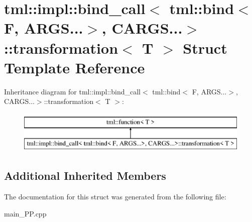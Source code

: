 \hypertarget{structtml_1_1impl_1_1bind__call_3_01tml_1_1bind_3_01F_00_01ARGS_8_8_8_4_00_01CARGS_8_8_8_4_1_1transformation}{\section{tml\+:\+:impl\+:\+:bind\+\_\+call$<$ tml\+:\+:bind$<$ F, A\+R\+G\+S...$>$, C\+A\+R\+G\+S...$>$\+:\+:transformation$<$ T $>$ Struct Template Reference}
\label{structtml_1_1impl_1_1bind__call_3_01tml_1_1bind_3_01F_00_01ARGS_8_8_8_4_00_01CARGS_8_8_8_4_1_1transformation}
}
Inheritance diagram for tml\+:\+:impl\+:\+:bind\+\_\+call$<$ tml\+:\+:bind$<$ F, A\+R\+G\+S...$>$, C\+A\+R\+G\+S...$>$\+:\+:transformation$<$ T $>$\+:\begin{figure}[H]
\begin{center}
\leavevmode
\includegraphics[height=2.000000cm]{structtml_1_1impl_1_1bind__call_3_01tml_1_1bind_3_01F_00_01ARGS_8_8_8_4_00_01CARGS_8_8_8_4_1_1transformation}
\end{center}
\end{figure}
\subsection*{Additional Inherited Members}


The documentation for this struct was generated from the following file\+:\begin{DoxyCompactItemize}
\item 
main\+\_\+\+P\+P.\+cpp\end{DoxyCompactItemize}
